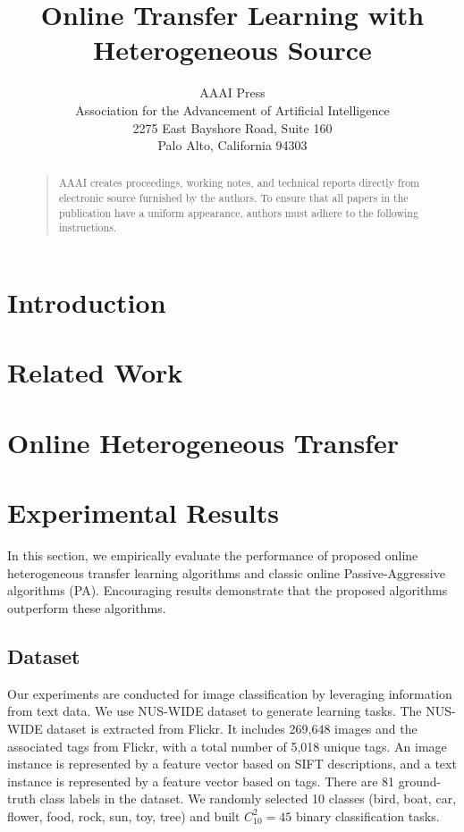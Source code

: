 \documentclass[letterpaper]{article}
\begin{document}
%
\title{Online Transfer Learning with Heterogeneous Source}
\author{AAAI Press\\
Association for the Advancement of Artificial Intelligence\\
2275 East Bayshore Road, Suite 160\\
Palo Alto, California 94303\\
}
\maketitle
\begin{abstract}
\begin{quote}
AAAI creates proceedings, working notes, and technical reports directly from electronic source furnished by the authors. To ensure that all papers in the publication have a uniform appearance, authors must adhere to the following instructions. 
\end{quote}
\end{abstract}


\section{Introduction}

\section{Related Work}

\section{Online Heterogeneous Transfer}

\section{Experimental Results}

In this section, we empirically evaluate the performance of proposed online heterogeneous transfer learning algorithms and classic online Passive-Aggressive algorithms (PA).
Encouraging results demonstrate that the proposed algorithms outperform these algorithms.

\subsection{Dataset}
Our experiments are conducted for image classification by leveraging information from text data.
We use NUS-WIDE dataset to generate learning tasks.
The NUS-WIDE dataset is extracted from Flickr.
It includes 269,648 images and the associated tags from Flickr, with a total number of 5,018 unique tags.
An image instance is represented by a feature vector based on SIFT descriptions, and a text instance is represented by a feature vector based on tags.
There are 81 ground-truth class labels in the dataset.
We randomly selected 10 classes (bird, boat, car, flower, food, rock, sun, toy, tree) and built $C_{10}^{2} = 45$ binary classification tasks.
\end{document}
